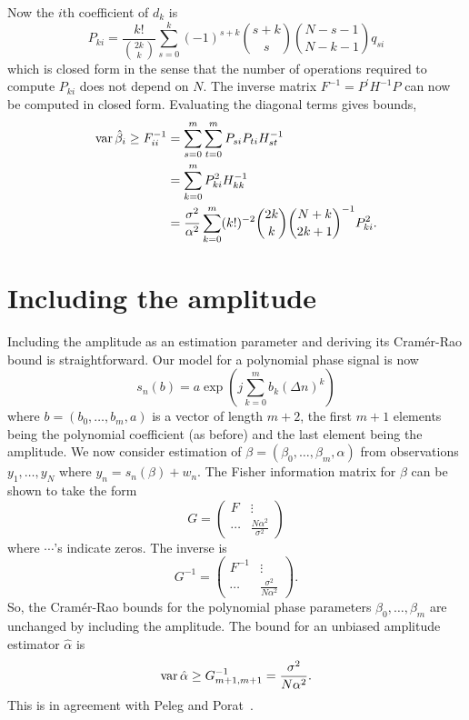 \documentclass[journal,10pt]{IEEEtran}
\begin{document}
Now the $i$th coefficient of $d_k$ is
\[
P_{ki} = \frac{k!}{\binom{2k}{k}}\sum_{s=0}^k{(-1)^{s+k}\binom{s+k}{s}\binom{N-s-1}{N-k-1}q_{si}}
\]  
which is closed form in the sense that the number of operations required to compute $P_{ki}$ does not depend on $N$.  The inverse matrix $F^{-1} = P^\prime H^{-1} P$ can now be computed in closed form.  Evaluating the diagonal terms gives bounds,
\begin{align*}
\operatorname{var} \hat{\beta}_i \geq F_{ii}^{-1} &=  \sum_{s=0}^{m}\sum_{t=0}^{m} P_{si} P_{ti}  H_{st}^{-1} \\
&=  \sum_{k=0}^{m} P_{ki}^2  H_{kk}^{-1} \\
&= \frac{\sigma^2}{\alpha^2} \sum_{k=0}^{m} (k!)^{-2} \binom{2k}{k} \binom{N+k}{2k+1}^{-1} P_{ki}^2.
\end{align*}
 

 

\section{Including the amplitude}\label{sec:including-amplitude}

Including the amplitude as an estimation parameter and deriving its Cram\'{e}r-Rao bound is straightforward.  Our model for a polynomial phase signal is now
\[
s_n(b) = a \exp\left( j \sum_{k = 0}^{m}{b_k (\Delta n)^k}\right)
\]
where $b=(b_0, \dots, b_m, a)$ is a vector of length $m+2$, the first $m+1$ elements being the polynomial coefficient (as before) and the last element being the amplitude.  We now consider estimation of $\beta = (\beta_0, \dots, \beta_m, \alpha)$ from observations $y_1, \dots, y_N$ where $y_n = s_n(\beta) + w_n$.  The Fisher information matrix for $\beta$ can be shown to take the form
\[
G = \left( \begin{array}{cc}
F & \vdots \\
\cdots & \frac{N\alpha^2}{\sigma^2}
\end{array}\right)
\]
where $\cdots$'s indicate zeros.  The inverse is
\[
G^{-1} = \left( \begin{array}{cc}
F^{-1} & \vdots \\
\cdots & \frac{\sigma^2}{N\alpha^2}
\end{array} \right).
\]
So, the Cram\'{e}r-Rao bounds for the polynomial phase parameters $\beta_0, \dots, \beta_m$ are unchanged by including the amplitude.  The bound for an unbiased amplitude estimator $\hat{\alpha}$ is
\[
\operatorname{var} \hat{\alpha} \geq G_{m+1,m+1}^{-1} = \frac{\sigma^2}{N\alpha^2}.
\]
This is in agreement with Peleg and Porat~\cite{Peleg1991_CRB_PPS_1991}.
\end{document}
